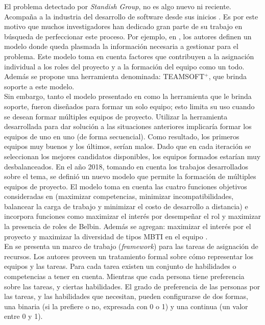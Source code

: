El problema detectado por \textit{Standish Group}, no es algo nuevo ni reciente. Acompaña a la industria del desarrollo de software desde sus inicios \cite{ElEmam2008}. Es por este motivo que muchos investigadores han dedicado gran parte de su trabajo en búsqueda de perfeccionar este proceso. Por ejemplo, en \cite{Mayi09}, los autores definen un modelo donde queda plasmada la información necesaria a gestionar para el problema. Este modelo toma en cuenta factores que contribuyen a la asignación individual a los roles del proyecto y a la formación del equipo como un todo. Además se propone una herramienta denominada: TEAMSOFT$^+$, que brinda soporte a este modelo.\\

Sin embargo, tanto el modelo presentado en \cite{Mayi09} como la herramienta que le brinda soporte, fueron diseñados para formar un solo equipo; esto limita su uso cuando se desean formar múltiples equipos de proyecto. Utilizar la herramienta desarrollada para dar solución a las situaciones anteriores implicaría formar los equipos de uno en uno (de forma secuencial). Como resultado, los primeros equipos muy buenos y los últimos, serían malos. Dado que en cada iteración se seleccionan los mejores candidatos disponibles, los equipos formados estarían muy  desbalanceados. En el año 2018, tomando en cuenta los trabajos desarrollados sobre el tema, se definió un nuevo modelo que permite la formación de múltiples equipos de proyecto. El modelo toma en cuenta las cuatro funciones objetivos consideradas en \cite{Mayi09} (maximizar competencias, minimizar incompatibilidades, balancear la carga de trabajo y minimizar el costo de desarrollo a distancia) e incorpora funciones como maximizar el interés por desempeñar el rol y maximizar la presencia de roles de Belbin. Además se agregan: maximizar el interés por el proyecto y maximizar la diversidad de tipos MBTI en el equipo \cite{Duran2019}.\\


En \cite{Anagnostopoulos2010} se presenta un marco de trabajo (\textit{framework}) para las tareas de asignación de recursos. Los autores proveen un tratamiento formal sobre cómo representar los equipos y las tareas. Para cada tarea existen un conjunto de habilidades o competencias a tener en cuenta. Mientras que cada persona tiene preferencia sobre las tareas, y ciertas habilidades. El grado de preferencia de las personas por las tareas, y las habilidades que necesitan, pueden configurarse de dos formas, una binaria (si la prefiere o no, expresada con 0 o 1) y una continua (un valor entre 0 y 1).\\


